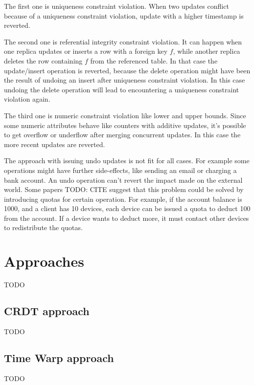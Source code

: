 \documentclass[a4paper, 11pt, oneside]{article}
\theoremstyle{definition}
\begin{document}
The first one is uniqueness constraint violation. When two updates conflict because of a uniqueness constraint violation, update with a higher timestamp is reverted. 

The second one is referential integrity constraint violation. It can happen when one replica updates or inserts a row with a foreign key $f$, while another replica deletes the row containing $f$ from the referenced table. In that case the update/insert operation is reverted, because the delete operation might have been the result of undoing an insert after uniqueness constraint violation. In this case undoing the delete operation will lead to encountering a uniqueness constraint violation again.

The third one is numeric constraint violation like lower and upper bounds. Since some numeric attributes behave like counters with additive updates, it's possible to get overflow or underflow after merging concurrent updates. In this case the more recent updates are reverted.

The approach with issuing undo updates is not fit for all cases. For example some operations might have further side-effects, like sending an email or charging a bank account.  An undo operation can't revert the impact made on the external world. Some papers TODO: CITE suggest that this problem could be solved by introducing quotas for certain operation. For example, if the account balance is 1000, and a client has 10 devices, each device can be issued a quota to deduct 100 from the account. If a device wants to deduct more, it must contact other devices to redistribute the quotas. 


\section{Approaches}
TODO
\subsection{CRDT approach}
TODO
\subsection{Time Warp approach}
TODO
\end{document}
